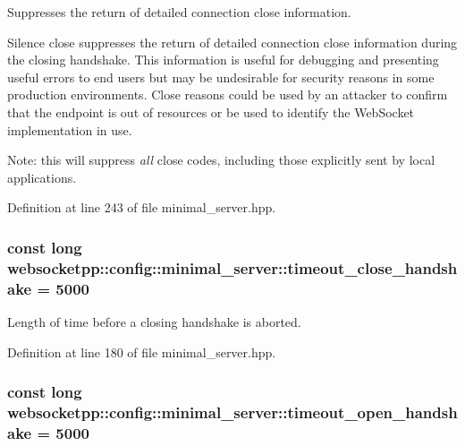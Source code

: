 Suppresses the return of detailed connection close information. 

Silence close suppresses the return of detailed connection close information during the closing handshake. This information is useful for debugging and presenting useful errors to end users but may be undesirable for security reasons in some production environments. Close reasons could be used by an attacker to confirm that the endpoint is out of resources or be used to identify the Web\+Socket implementation in use.

Note\+: this will suppress {\itshape all} close codes, including those explicitly sent by local applications. 

Definition at line 243 of file minimal\+\_\+server.\+hpp.

\hypertarget{structwebsocketpp_1_1config_1_1minimal__server_aaad75d432962b0a059f2ae7a6378b4e2}{}
\subsubsection[{timeout\+\_\+close\+\_\+handshake}]{\setlength{\rightskip}{0pt plus 5cm}const long websocketpp\+::config\+::minimal\+\_\+server\+::timeout\+\_\+close\+\_\+handshake = 5000\hspace{0.3cm}{\ttfamily [static]}}\label{structwebsocketpp_1_1config_1_1minimal__server_aaad75d432962b0a059f2ae7a6378b4e2}


Length of time before a closing handshake is aborted. 



Definition at line 180 of file minimal\+\_\+server.\+hpp.

\hypertarget{structwebsocketpp_1_1config_1_1minimal__server_a5ea3c55d3cd784ef8cfb8c371a7ec209}{}
\subsubsection[{timeout\+\_\+open\+\_\+handshake}]{\setlength{\rightskip}{0pt plus 5cm}const long websocketpp\+::config\+::minimal\+\_\+server\+::timeout\+\_\+open\+\_\+handshake = 5000\hspace{0.3cm}{\ttfamily [static]}}\label{structwebsocketpp_1_1config_1_1minimal__server_a5ea3c55d3cd784ef8cfb8c371a7ec209}


